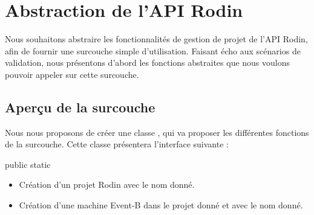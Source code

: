 \chapter{Abstraction de l'API Rodin}

Nous souhaitons abstraire les fonctionnalités de gestion de projet de l'API Rodin, afin de fournir une surcouche simple d'utilisation.
Faisant écho aux scénarios de validation, nous présentons d'abord les fonctions abstraites que nous voulons pouvoir appeler sur cette surcouche.


\section{Aperçu de la surcouche}

Nous nous proposons de créer une classe , qui va proposer les différentes fonctions de la surcouche.
Cette classe présentera l'interface suivante :


\vspace{\baselineskip}
\begin{labeling}{public static}
    \setlength{\itemsep}{1.5em}

    \item [\javacode{public static}] 
        \begin{itemize}[label={}]
            \item Création d'un projet Rodin avec le nom donné.
        \end{itemize}

    \item [\javacode{public static}] 
        \begin{itemize}[label={}]
            \item Création d'une machine Event-B dans le projet donné et avec le nom donné.
        \end{itemize}

\end{labeling}



